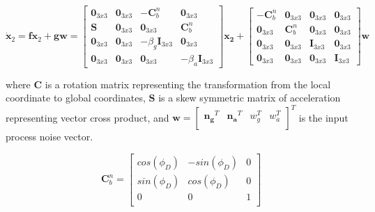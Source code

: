 \begin{equation}
  \boldsymbol{\dot{x}}_2 = \boldsymbol{f}\boldsymbol{x}_2 + \boldsymbol{g}\boldsymbol{w} = \begin{bmatrix}
        \boldsymbol{0}_{3x3} & \boldsymbol{0}_{3x3} & \boldsymbol{-C}^n_b & \boldsymbol{0}_{3x3} \\
        \boldsymbol{S} & \boldsymbol{0}_{3x3} & \boldsymbol{0}_{3x3} & \boldsymbol{C}^n_b \\
        \boldsymbol{0}_{3x3} & \boldsymbol{0}_{3x3} & -\beta_g\boldsymbol{I}_{3x3} & \boldsymbol{0}_{3x3} \\
        \boldsymbol{0}_{3x3} & \boldsymbol{0}_{3x3} & \boldsymbol{0}_{3x3} & -\beta_a\boldsymbol{I}_{3x3}
      \end{bmatrix}\boldsymbol{x_2}
      +
      \begin{bmatrix}
        \boldsymbol{-C}^n_b & \boldsymbol{0}_{3x3} & \boldsymbol{0}_{3x3} & \boldsymbol{0}_{3x3} \\
        \boldsymbol{0}_{3x3} & \boldsymbol{C}^n_b & \boldsymbol{0}_{3x3} & \boldsymbol{0}_{3x3} \\
        \boldsymbol{0}_{3x3} & \boldsymbol{0}_{3x3} & \boldsymbol{I}_{3x3} & \boldsymbol{0}_{3x3} \\
        \boldsymbol{0}_{3x3} & \boldsymbol{0}_{3x3} & \boldsymbol{0}_{3x3} & \boldsymbol{I}_{3x3}
      \end{bmatrix}\boldsymbol{w}
\end{equation}

where $\boldsymbol{C}$ is a rotation matrix representing the transformation from the local coordinate 
to global coordinates, $\boldsymbol{S}$ is a skew symmetric matrix of acceleration representing
vector cross product, and $\boldsymbol{w} = 
\begin{bmatrix}
  \boldsymbol{n_g}^T & \boldsymbol{n_a}^T & w_g^T & w_a^T \\
\end{bmatrix}^T$ is the input process noise vector. 

\begin{equation}
  \boldsymbol{C}^n_b = \begin{bmatrix}
        cos(\phi_D) & -sin(\phi_D) & 0 \\
        sin(\phi_D) &  cos(\phi_D) & 0 \\
        0 & 0 & 1 \\
      \end{bmatrix}
\end{equation}

